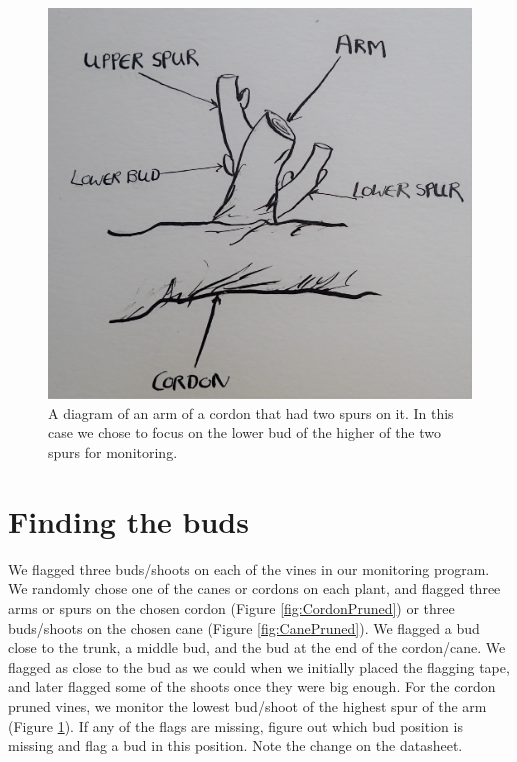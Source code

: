 \documentclass[11pt,letter]{article}
\begin{document}
\begin{figure}%
  \includegraphics[width=\linewidth]{TwoSpurs.jpg}
  \caption{A diagram of an arm of a cordon that had two spurs on it. In this case we chose to focus on the lower bud of the higher of the two spurs for monitoring. }
  \label{fig:TwoSpurs}
\end{figure}

\section{Finding the buds}
We flagged three buds/shoots on each of the vines in our monitoring program. We randomly chose one of the canes or cordons on each plant, and flagged three arms or spurs on the chosen cordon (Figure \ref{fig:CordonPruned}) or three buds/shoots on the chosen cane (Figure \ref{fig:CanePruned}). We flagged a bud close to the trunk, a middle bud, and the bud at the end of the cordon/cane. We flagged as close to the bud as we could when we initially placed the flagging tape, and later flagged some of the shoots once they were big enough. For the cordon pruned vines, we monitor the lowest bud/shoot of the highest spur of the arm (Figure \ref{fig:TwoSpurs}). If any of the flags are missing, figure out which bud position is missing and flag a bud in this position. Note the change on the datasheet.
\end{document}
